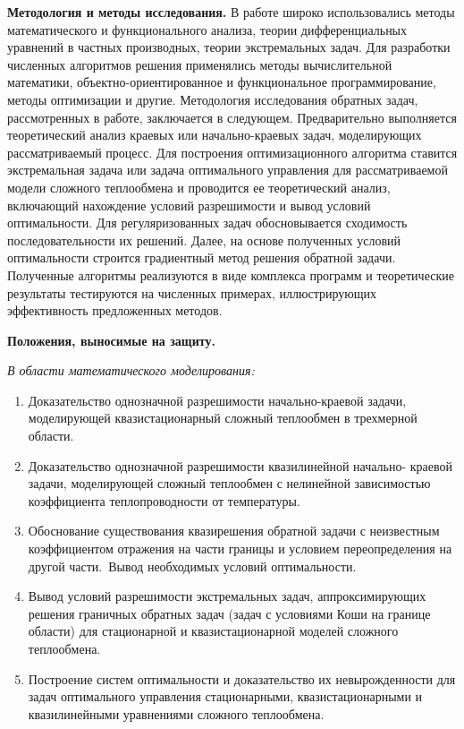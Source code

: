     \textbf{Методология и методы исследования.}
    В работе широко использовались методы математического и функционального анализа,
    теории дифференциальных уравнений в частных производных, теории экстремальных задач.
    Для разработки численных алгоритмов решения применялись методы
    вычислительной математики, объектно-ориентированное и функциональное
    программирование, методы оптимизации и другие.
    Методология исследования обратных задач, рассмотренных в работе,
    заключается в следующем.
    Предварительно выполняется теоретический анализ краевых или начально-краевых задач, моделирующих
    рассматриваемый процесс.
    Для построения оптимизационного алгоритма ставится экстремальная задача или задача
    оптимального управления для рассматриваемой модели сложного теплообмена и проводится ее
    теоретический анализ, включающий нахождение условий разрешимости и
    вывод условий оптимальности.
    Для регуляризованных задач обосновывается
    сходимость последовательности их решений.
    Далее, на основе полученных условий оптимальности
    строится градиентный метод решения обратной задачи.
    Полученные алгоритмы реализуются в виде комплекса программ и
    теоретические результаты тестируются на численных примерах,
    иллюстрирующих эффективность предложенных методов.


    \textbf{Положения, выносимые на защиту.}

    \textit{В области математического моделирования:}

    \begin{enumerate}[leftmargin=5.5mm]
        \item Доказательство однозначной разрешимости начально-краевой задачи,
        моделирующей квазистационарный сложный теплообмен в трехмерной
        области.
        \item Доказательство однозначной разрешимости квазилинейной начально-
        краевой задачи, моделирующей сложный теплообмен с нелинейной
        зависимостью коэффициента теплопроводности от температуры.
        \item Обоснование существования квазирешения обратной задачи с неизвестным
        коэффициентом отражения на части границы и условием переопределения на
        другой части.\ Вывод необходимых условий оптимальности.
        \item Вывод условий разрешимости экстремальных задач, аппроксимирующих
        решения граничных обратных задач (задач с условиями Коши на границе
        области) для стационарной и квазистационарной моделей сложного
        теплообмена.
        \item Построение систем оптимальности и доказательство их невырожденности
        для задач оптимального управления стационарными, квазистационарными и
        квазилинейными уравнениями сложного теплообмена.
        \setcounter{nameOfYourChoice}{\value{enumi}}
    \end{enumerate}

